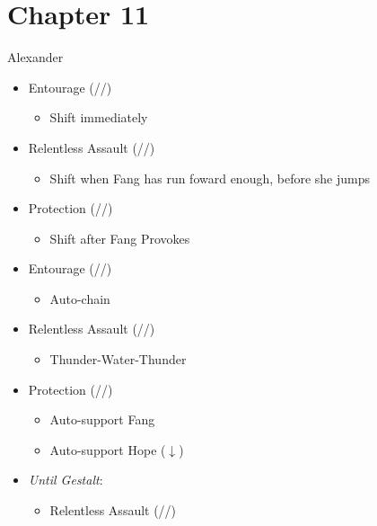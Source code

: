 \chapter{Chapter 11}

\renewcommand{\first}{[1] Entourage (\rav/\med/\sen)}
\renewcommand{\second}{[2] Protection (\syn/\med/\sen)}
\renewcommand{\third}{[3] }
\renewcommand{\fourth}{[4] }
\renewcommand{\fifth}{[5] }
\renewcommand{\sixth}{[6] Relentless Assault (\rav/\rav/\com)}
\begin{battle}[1:29]{Alexander}
	\begin{itemize}
		\item \first
		      \begin{itemize}
			      \item Shift immediately
		      \end{itemize}
		\item \sixth
		      \begin{itemize}
			      \item Shift when Fang  has run foward enough, before she jumps
		      \end{itemize}
		\item \second
		      \begin{itemize}
			      \item Shift after Fang Provokes
		      \end{itemize}
		\item \first
		      \begin{itemize}
			      \item Auto-chain
		      \end{itemize}
		\item \sixth
		      \begin{itemize}
			      \item Thunder-Water-Thunder
		      \end{itemize}
		\item \second
		      \begin{itemize}
			      \item Auto-support Fang
			      \item Auto-support Hope ($\downarrow$)
		      \end{itemize}
		\item \textit{Until Gestalt}:
		      \begin{itemize}
			      \item \begin{flushleft}\sixth\end{flushleft}
			            \begin{itemize}

\end{itemize}
\end{itemize}
\end{itemize}
\end{battle}
